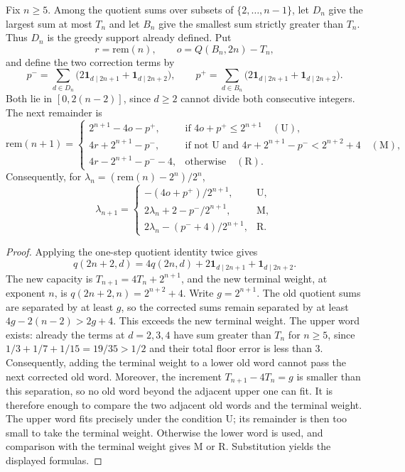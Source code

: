 \begin{thm}
\label{thm:dynamics}
Fix $n\ge5$.  Among the quotient sums over subsets of
$\{2,\ldots,n-1\}$, let $D_n$ give the largest sum at most $T_n$
and let $B_n$ give the smallest sum strictly greater than $T_n$.
Thus $D_n$ is the greedy support already defined.  Put
\[
 r=\mathrm{rem}(n),\qquad o=Q(B_n,2n)-T_n,
\]
and define the two correction terms by
\[
 p^- =\sum_{d\in D_n}\bigl(2\mathbf1_{d\mid2n+1}
                              +\mathbf1_{d\mid2n+2}\bigr),\qquad
 p^+ =\sum_{d\in B_n}\bigl(2\mathbf1_{d\mid2n+1}
                              +\mathbf1_{d\mid2n+2}\bigr).
\]
Both lie in $[0,2(n-2)]$, since $d\ge2$ cannot divide both
consecutive integers.  The next remainder is
\[
 \mathrm{rem}(n+1)=
 \begin{cases}
 2^{n+1}-4o-p^+,&\text{if }4o+p^+\le2^{n+1}\quad(\mathrm U),\\
 4r+2^{n+1}-p^-,&\text{if not }\mathrm U\text{ and }
                   4r+2^{n+1}-p^-<2^{n+2}+4\quad(\mathrm M),\\
 4r-2^{n+1}-p^--4,&\text{otherwise}\quad(\mathrm R).
 \end{cases}
\]
Consequently, for $\lambda_n=(\mathrm{rem}(n)-2^n)/2^n$,
\begin{equation*}
 \lambda_{n+1}=
 \begin{cases}
 -(4o+p^+)/2^{n+1},&\mathrm U,\\
 2\lambda_n+2-p^-/2^{n+1},&\mathrm M,\\
 2\lambda_n-(p^-+4)/2^{n+1},&\mathrm R.
 \end{cases}
 \tag{III}
\end{equation*}
\end{thm}

\begin{proof}
Applying the one-step quotient identity twice gives
\[
 q(2n+2,d)=4q(2n,d)+2\mathbf1_{d\mid2n+1}
                         +\mathbf1_{d\mid2n+2}.
\]
The new capacity is $T_{n+1}=4T_n+2^{n+1}$, and the new terminal
weight, at exponent $n$, is $q(2n+2,n)=2^{n+2}+4$.
Write $g=2^{n+1}$.  The old quotient sums are separated by at
least $g$, so the corrected sums remain separated by at least
$4g-2(n-2)>2g+4$.  This exceeds the new terminal weight.
The upper word exists: already the terms at $d=2,3,4$ have
sum greater than $T_n$ for $n\ge5$, since
$1/3+1/7+1/15=19/35>1/2$ and their total floor error is less than $3$.
Consequently, adding the terminal weight to a lower old word cannot
pass the next corrected old word.  Moreover, the increment
$T_{n+1}-4T_n=g$ is smaller than this separation, so no old word
beyond the adjacent upper one can fit.  It is therefore enough
to compare the two adjacent old words and the terminal weight.  The upper word fits precisely under
the condition $\mathrm U$; its remainder is then too small to take
the terminal weight.  Otherwise the lower word is used, and
comparison with the terminal weight gives $\mathrm M$ or
$\mathrm R$.  Substitution yields the displayed formulas.
\end{proof}

